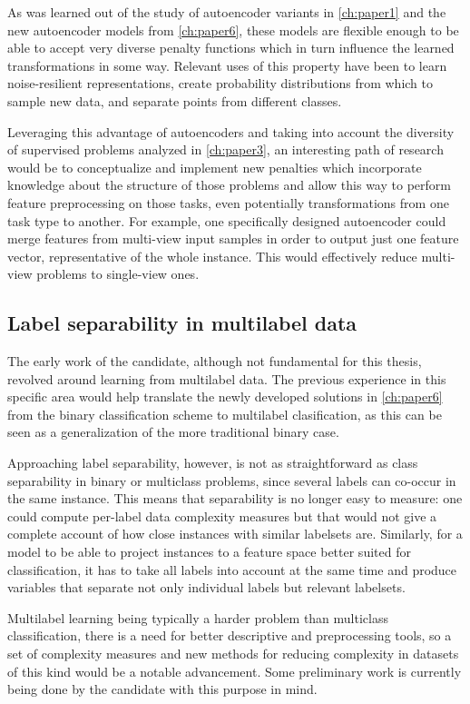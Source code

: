 As was learned out of the study of autoencoder variants in \autoref{ch:paper1} and the new autoencoder models from \autoref{ch:paper6}, these models are flexible enough to be able to accept very diverse penalty functions which in turn influence the learned transformations in some way. Relevant uses of this property have been to learn noise-resilient representations, create probability distributions from which to sample new data, and separate points from different classes. 

Leveraging this advantage of autoencoders and taking into account the diversity of supervised problems analyzed in \autoref{ch:paper3}, an interesting path of research would be to conceptualize and implement new penalties which incorporate knowledge about the structure of those problems and allow this way to perform feature preprocessing on those tasks, even potentially transformations from one task type to another. For example, one specifically designed autoencoder could merge features from multi-view input samples in order to output just one feature vector, representative of the whole instance. This would effectively reduce multi-view problems to single-view ones.

\subsection{Label separability in multilabel data}

The early work of the candidate, although not fundamental for this thesis, revolved around learning from multilabel data. The previous experience in this specific area would help translate the newly developed solutions in \autoref{ch:paper6} from the binary classification scheme to multilabel clasification, as this can be seen as a generalization of the more traditional binary case. 

Approaching label separability, however, is not as straightforward as class separability in binary or multiclass problems, since several labels can co-occur in the same instance. This means that separability is no longer easy to measure: one could compute per-label data complexity measures but that would not give a complete account of how close instances with similar labelsets are. Similarly, for a model to be able to project instances to a feature space better suited for classification, it has to take all labels into account at the same time and produce variables that separate not only individual labels but relevant labelsets.

Multilabel learning being typically a harder problem than multiclass classification, there is a need for better descriptive and preprocessing tools, so a set of complexity measures and new methods for reducing complexity in datasets of this kind would be a notable advancement. Some preliminary work is currently being done by the candidate with this purpose in mind.

